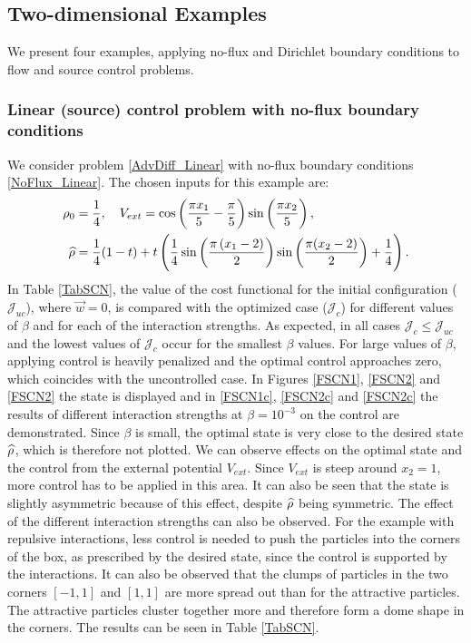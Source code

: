 


\subsection{Two-dimensional Examples}
We present four examples, applying no-flux and Dirichlet boundary conditions to flow and source control problems.

\subsubsection{Linear (source) control problem with no-flux boundary conditions}
We consider problem \eqref{AdvDiff_Linear} with no-flux boundary conditions \eqref{NoFlux_Linear}.
The chosen inputs for this example are:
\begin{align*}
	\rho_0 &= \frac{1}{4}, \quad V_{ext} = \cos\left(\frac{\pi x_1}{5} - \frac{\pi}{5}\right)\sin\left(\frac{\pi x_2}{5}\right),\\
	\widehat \rho &= \frac{1}{4}(1 - t) + t\left(\frac{1}{4}\sin\left(\frac{\pi \left(x_1 - 2\right)}{2}\right)\sin\left(\frac{\pi (x_2 - 2)}{2}\right) + \frac{1}{4}\right).
\end{align*}
In Table  \ref{TabSCN},  the value of the cost functional for the initial configuration ($\mathcal{J}_{uc}$), where $\vec{w} =0$, is compared with the optimized case ($\mathcal{J}_{c}$) for different values of $\beta$ and for each of the interaction strengths. As expected, in all cases 
$\mathcal{J}_{c} \leq \mathcal{J}_{uc}$  and the lowest values of $\mathcal{J}_{c}$ occur for the smallest $\beta$ values. For large values of $\beta$, applying control is heavily penalized and the optimal control approaches zero, which coincides with the uncontrolled case.
In Figures \ref{FSCN1}, \ref{FSCN2} and \ref{FSCN2} the state is displayed and in \ref{FSCN1c}, \ref{FSCN2c} and \ref{FSCN2c} the results of different interaction strengths at $\beta = 10^{-3}$ on the control are demonstrated. Since $\beta$ is small, the optimal state is very close to the desired state $\widehat \rho$, which is therefore not plotted. We can observe effects on the optimal state and the control from the external potential $V_{ext}$. Since $V_{ext}$ is steep around $x_2 = 1$, more control has to be applied in this area. It can also be seen that the state is slightly asymmetric because of this effect, despite $\widehat \rho$ being symmetric.
The effect of the different interaction strengths can also be observed. For the example with repulsive interactions, less control is needed to push the particles into the corners of the box, as prescribed by the desired state, since the control is supported by the interactions. It can also be observed that the clumps of particles in the two corners $[-1,1]$ and $[1,1]$ are more spread out than for the attractive particles. The attractive particles cluster together more and therefore form a dome shape in the corners.
The results can be seen in Table \ref{TabSCN}.

